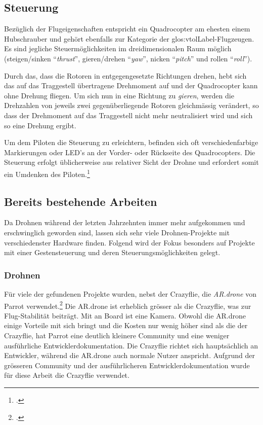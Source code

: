 \subsection{Steuerung}
Bezüglich der Flugeigenschaften entspricht ein Quadrocopter am ehesten einem Hubschrauber und gehört ebenfalls zur Kategorie der  \gls{glos:vtolLabel}-Flugzeugen.
Es sind jegliche Steuermöglichkeiten im dreidimensionalen Raum möglich (steigen/sinken "`\textit{thrust}"', gieren/drehen "`\textit{yaw}"', nicken "`\textit{pitch}"' und rollen "`\textit{roll}"').

Durch das, dass die Rotoren in entgegengesetzte Richtungen drehen, hebt sich das auf das Traggestell übertragene Drehmoment auf und der Quadrocopter kann ohne Drehung fliegen.
Um sich nun in eine Richtung zu \textit{gieren}, werden die Drehzahlen von jeweils zwei gegenüberliegende Rotoren gleichmässig verändert, so dass der Drehmoment auf das Traggestell nicht mehr neutralisiert wird und sich so eine Drehung ergibt.

Um dem Piloten die Steuerung zu erleichtern, befinden sich oft verschiedenfarbige Markierungen oder LED's an der Vorder- oder Rückseite des Quadrocopters.
Die Steuerung erfolgt üblicherweise aus relativer Sicht der Drohne und erfordert somit ein Umdenken des Piloten.\footcite{Quadrocopter__Wikipedia_2015-03-22}

\newpage
\subsection{Bereits bestehende Arbeiten}
Da Drohnen während der letzten Jahrzehnten immer mehr aufgekommen und erschwinglich geworden sind, lassen sich sehr viele Drohnen-Projekte mit verschiedenster Hardware finden.
Folgend wird der Fokus besonders auf Projekte mit einer Gestensteuerung und deren Steuerungsmöglichkeiten gelegt.


\subsubsection{Drohnen}
Für viele der gefundenen Projekte wurden, nebst der Crazyflie, die \textit{AR.drone} von Parrot verwendet.\footcite{AR_Drone_2.0_Parrot_2015-04-29}
Die AR.drone ist erheblich grösser als die Crazyflie, was zur Flug-Stabilität beiträgt.
Mit an Board ist eine Kamera.
Obwohl die AR.drone einige Vorteile mit sich bringt und die Kosten nur wenig höher sind als die der Crazyflie, hat Parrot eine deutlich kleinere Community und eine weniger ausführliche Entwicklerdokumentation.
Die Crazyflie richtet sich hauptsächlich an Entwickler, während die AR.drone auch normale Nutzer anspricht.
Aufgrund der grösseren Community und der ausführlicheren Entwicklerdokumentation wurde für diese Arbeit die Crazyflie verwendet.

